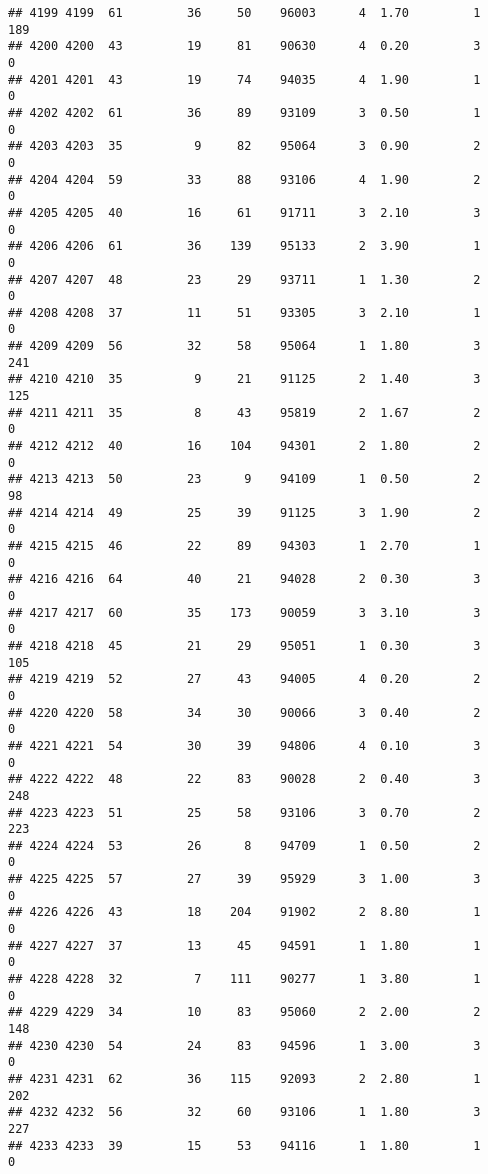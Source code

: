 \documentclass[
]{article}
\begin{document}
\begin{verbatim}
## 4199 4199  61         36     50    96003      4  1.70         1      189
## 4200 4200  43         19     81    90630      4  0.20         3        0
## 4201 4201  43         19     74    94035      4  1.90         1        0
## 4202 4202  61         36     89    93109      3  0.50         1        0
## 4203 4203  35          9     82    95064      3  0.90         2        0
## 4204 4204  59         33     88    93106      4  1.90         2        0
## 4205 4205  40         16     61    91711      3  2.10         3        0
## 4206 4206  61         36    139    95133      2  3.90         1        0
## 4207 4207  48         23     29    93711      1  1.30         2        0
## 4208 4208  37         11     51    93305      3  2.10         1        0
## 4209 4209  56         32     58    95064      1  1.80         3      241
## 4210 4210  35          9     21    91125      2  1.40         3      125
## 4211 4211  35          8     43    95819      2  1.67         2        0
## 4212 4212  40         16    104    94301      2  1.80         2        0
## 4213 4213  50         23      9    94109      1  0.50         2       98
## 4214 4214  49         25     39    91125      3  1.90         2        0
## 4215 4215  46         22     89    94303      1  2.70         1        0
## 4216 4216  64         40     21    94028      2  0.30         3        0
## 4217 4217  60         35    173    90059      3  3.10         3        0
## 4218 4218  45         21     29    95051      1  0.30         3      105
## 4219 4219  52         27     43    94005      4  0.20         2        0
## 4220 4220  58         34     30    90066      3  0.40         2        0
## 4221 4221  54         30     39    94806      4  0.10         3        0
## 4222 4222  48         22     83    90028      2  0.40         3      248
## 4223 4223  51         25     58    93106      3  0.70         2      223
## 4224 4224  53         26      8    94709      1  0.50         2        0
## 4225 4225  57         27     39    95929      3  1.00         3        0
## 4226 4226  43         18    204    91902      2  8.80         1        0
## 4227 4227  37         13     45    94591      1  1.80         1        0
## 4228 4228  32          7    111    90277      1  3.80         1        0
## 4229 4229  34         10     83    95060      2  2.00         2      148
## 4230 4230  54         24     83    94596      1  3.00         3        0
## 4231 4231  62         36    115    92093      2  2.80         1      202
## 4232 4232  56         32     60    93106      1  1.80         3      227
## 4233 4233  39         15     53    94116      1  1.80         1        0

\end{verbatim}
\end{document}
